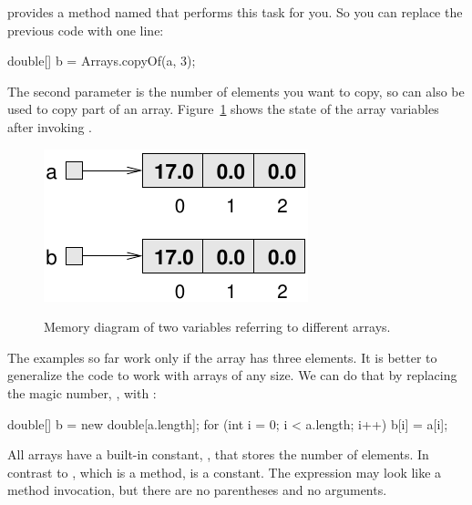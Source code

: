 
 provides a method named  that performs this task for you.
So you can replace the previous code with one line:

\begin{code}
double[] b = Arrays.copyOf(a, 3);
\end{code}

The second parameter is the number of elements you want to copy, so  can also be used to copy part of an array.
Figure~\ref{fig.array4} shows the state of the array variables after invoking .

\begin{figure}[!ht]
\begin{center}
\includegraphics[alt={Memory diagram showing two variables a and b pointing to separate arrays after using Arrays.copyOf, demonstrating independent array copies}]{figs/array4.pdf}
\caption{Memory diagram of two variables referring to different arrays.}
\label{fig.array4}
\end{center}
\end{figure}




The examples so far work only if the array has three elements.
It is better to generalize the code to work with arrays of any size.
We can do that by replacing the magic number, , with :

\begin{code}
double[] b = new double[a.length];
for (int i = 0; i < a.length; i++) {
    b[i] = a[i];
}
\end{code}

All arrays have a built-in constant, , that stores the number of elements.
In contrast to , which is a method,  is a constant.
The expression  may look like a method invocation, but there are no parentheses and no arguments.

